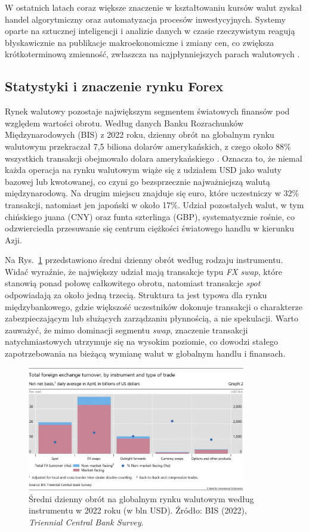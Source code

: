 W ostatnich latach coraz większe znaczenie w kształtowaniu kursów walut zyskał handel algorytmiczny oraz automatyzacja procesów inwestycyjnych. 
Systemy oparte na sztucznej inteligencji i analizie danych w czasie rzeczywistym reagują błyskawicznie na publikacje makroekonomiczne i zmiany cen, 
co zwiększa krótkoterminową zmienność, zwłaszcza na najpłynniejszych parach walutowych \parencite{chaboud2023}.

\subsection{Statystyki i znaczenie rynku Forex}

Rynek walutowy pozostaje największym segmentem światowych finansów pod względem wartości obrotu. 
Według danych Banku Rozrachunków Międzynarodowych (BIS) z 2022 roku, dzienny obrót na globalnym rynku walutowym przekraczał 7,5 biliona dolarów amerykańskich,
z czego około 88\% wszystkich transakcji obejmowało dolara amerykańskiego \parencite{bis2022}. 
Oznacza to, że niemal każda operacja na rynku walutowym wiąże się z udziałem USD jako waluty bazowej lub kwotowanej, co czyni go bezsprzecznie najważniejszą walutą międzynarodową.
Na drugim miejscu znajduje się euro, które uczestniczy w 32\% transakcji, natomiast jen japoński w około 17\%. 
Udział pozostałych walut, w tym chińskiego juana (CNY) oraz funta szterlinga (GBP), systematycznie rośnie, co odzwierciedla przesuwanie się centrum ciężkości światowego handlu w kierunku Azji.

Na Rys.~\ref{fig:bis_turnover} przedstawiono średni dzienny obrót według rodzaju instrumentu. 
Widać wyraźnie, że największy udział mają transakcje typu \textit{FX swap}, które stanowią ponad połowę całkowitego obrotu, natomiast transakcje \textit{spot} odpowiadają za około jedną trzecią. 
Struktura ta jest typowa dla rynku międzybankowego, gdzie większość uczestników dokonuje transakcji o charakterze zabezpieczającym lub służących zarządzaniu płynnością, a nie spekulacji. 
Warto zauważyć, że mimo dominacji segmentu \textit{swap}, znaczenie transakcji natychmiastowych utrzymuje się na wysokim poziomie, 
co dowodzi stałego zapotrzebowania na bieżącą wymianę walut w globalnym handlu i finansach.

\begin{figure}[h!]
  \centering
  \includegraphics[width=0.85\textwidth]{plots/bis_fx_turnover_by_instrument_2022.jpg}
  \caption{Średni dzienny obrót na globalnym rynku walutowym według instrumentu w 2022 roku (w bln USD). Źródło: BIS (2022), \textit{Triennial Central Bank Survey}.}
  \label{fig:bis_turnover}
\end{figure}

